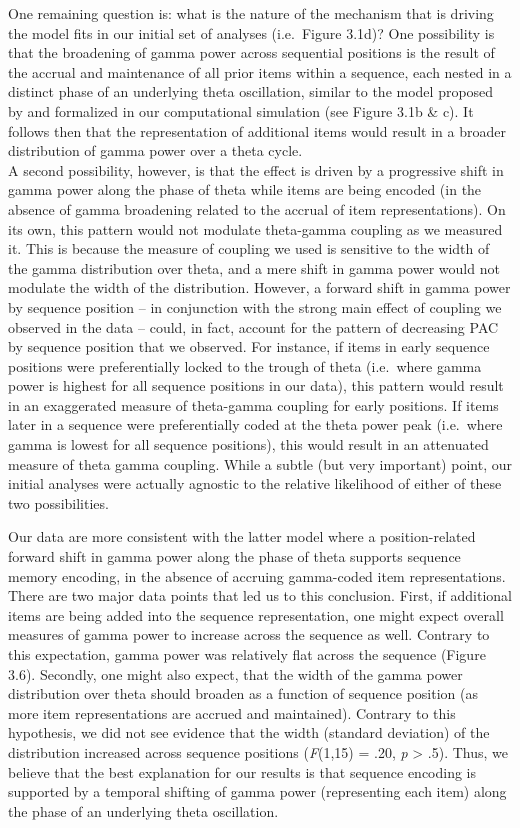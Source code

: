 One remaining question is: what is the nature of the mechanism that is
driving the model fits in our initial set of analyses (i.e.~Figure
3.1d)? One possibility is that the broadening of gamma power across
sequential positions is the result of the accrual and maintenance of all
prior items within a sequence, each nested in a distinct phase of an
underlying theta oscillation, similar to the model proposed by
\textcite{lisman_storage_1995} and formalized in our computational
simulation (see Figure 3.1b \& c). It follows then that the
representation of additional items would result in a broader
distribution of gamma power over a theta cycle.\\
A second possibility, however, is that the effect is driven by a
progressive shift in gamma power along the phase of theta while items
are being encoded (in the absence of gamma broadening related to the
accrual of item representations). On its own, this pattern would not
modulate theta-gamma coupling as we measured it. This is because the
measure of coupling we used is sensitive to the width of the gamma
distribution over theta, and a mere shift in gamma power would not
modulate the width of the distribution. However, a forward shift in
gamma power by sequence position -- in conjunction with the strong main
effect of coupling we observed in the data -- could, in fact, account
for the pattern of decreasing PAC by sequence position that we observed.
For instance, if items in early sequence positions were preferentially
locked to the trough of theta (i.e.~where gamma power is highest for all
sequence positions in our data), this pattern would result in an
exaggerated measure of theta-gamma coupling for early positions. If
items later in a sequence were preferentially coded at the theta power
peak (i.e.~where gamma is lowest for all sequence positions), this would
result in an attenuated measure of theta gamma coupling. While a subtle
(but very important) point, our initial analyses were actually agnostic
to the relative likelihood of either of these two possibilities.

Our data are more consistent with the latter model where a
position-related forward shift in gamma power along the phase of theta
supports sequence memory encoding, in the absence of accruing
gamma-coded item representations. There are two major data points that
led us to this conclusion. First, if additional items are being added
into the sequence representation, one might expect overall measures of
gamma power to increase across the sequence as well. Contrary to this
expectation, gamma power was relatively flat across the sequence (Figure
3.6). Secondly, one might also expect, that the width of the gamma power
distribution over theta should broaden as a function of sequence
position (as more item representations are accrued and maintained).
Contrary to this hypothesis, we did not see evidence that the width
(standard deviation) of the distribution increased across sequence
positions (\emph{F}(1,15) = .20, \emph{p} \textgreater{} .5). Thus, we
believe that the best explanation for our results is that sequence
encoding is supported by a temporal shifting of gamma power
(representing each item) along the phase of an underlying theta
oscillation.

